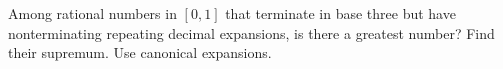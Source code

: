 Among rational numbers in $[0,1]$ that terminate in base three but have nonterminating repeating decimal expansions, is there a greatest number? Find their supremum. Use canonical expansions.
